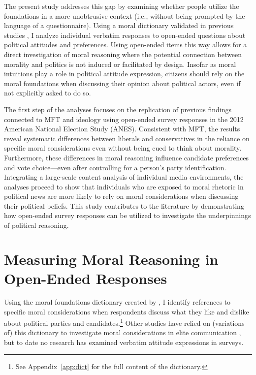 \documentclass[12pt]{article}
\begin{document}
The present study addresses this gap by examining whether people utilize the foundations in a more unobtrusive context (i.e., without being prompted by the language of a questionnaire). Using a moral dictionary validated in previous studies \citep[e.g.,][]{graham2009liberals}, I analyze individual verbatim responses to open-ended questions about political attitudes and preferences. Using open-ended items this way allows for a direct investigation of moral reasoning where the potential connection between morality and politics is not induced or facilitated by design. Insofar as moral intuitions play a role in political attitude expression, citizens should rely on the moral foundations when discussing their opinion about political actors, even if not explicitly asked to do so. 

The first step of the analyses focuses on the replication of previous findings connected to MFT and ideology using open-ended survey responses in the 2012 American National Election Study (ANES). Consistent with MFT, the results reveal systematic differences between liberals and conservatives in the reliance on specific moral considerations even without being cued to think about morality. Furthermore, these differences in moral reasoning influence candidate preferences and vote choice---even after controlling for a person's party identification. Integrating a large-scale content analysis of individual media environments, the analyses proceed to show that individuals who are exposed to moral rhetoric in political news are more likely to rely on moral considerations when discussing their political beliefs. This study contributes to the literature by demonstrating how open-ended survey responses can be utilized to investigate the underpinnings of political reasoning.


\section*{Measuring Moral Reasoning in Open-Ended Responses}

Using the moral foundations dictionary created by \citet{graham2009liberals}, I identify references to specific moral considerations when respondents discuss what they like and dislike about political parties and candidates.\footnote{See Appendix~\ref{app:dict} for the full content of the dictionary.} Other studies have relied on (variations of) this dictionary to investigate moral considerations in elite communication \citep[e.g.][]{clifford2015concerns}, but to date no research has examined verbatim attitude expressions in surveys.
\end{document}
